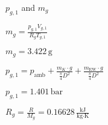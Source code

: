 \( p_{g,1} \) and \( m_g \)  

\( m_g = \frac{p_{g,1} V_{g,1}}{R_g T_{g,1}} \)  

\( m_g = 3.422 \, \text{g} \)  

\( p_{g,1} = p_{\text{amb}} + \frac{m_K \cdot g}{\frac{\pi}{4} D^2} + \frac{m_{\text{EW}} \cdot g}{\frac{\pi}{4} D^2} \)  

\( p_{g,1} = 1.401 \, \text{bar} \)  

\( R_g = \frac{R}{M_g} = 0.16628 \, \frac{\text{kJ}}{\text{kg·K}} \)